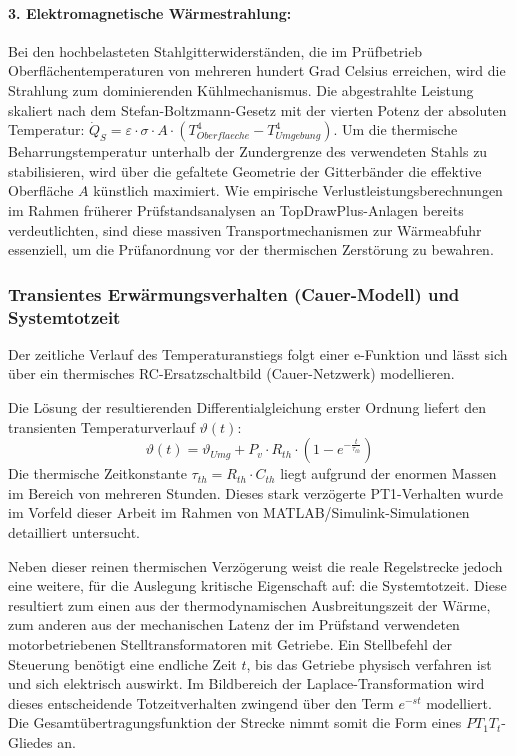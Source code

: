 \paragraph{3. Elektromagnetische Wärmestrahlung:} Bei den hochbelasteten Stahlgitterwiderständen, die im Prüfbetrieb Oberflächentemperaturen von mehreren hundert Grad Celsius erreichen, wird die Strahlung zum dominierenden Kühlmechanismus. Die abgestrahlte Leistung skaliert nach dem Stefan-Boltzmann-Gesetz mit der vierten Potenz der absoluten Temperatur: $\dot{Q}_S = \varepsilon \cdot \sigma \cdot A \cdot \left( T_{Oberflaeche}^4 - T_{Umgebung}^4 \right)$. Um die thermische Beharrungstemperatur unterhalb der Zundergrenze des verwendeten Stahls zu stabilisieren, wird über die gefaltete Geometrie der Gitterbänder die effektive Oberfläche $A$ künstlich maximiert. Wie empirische Verlustleistungsberechnungen im Rahmen früherer Prüfstandsanalysen an TopDrawPlus-Anlagen bereits verdeutlichten, sind diese massiven Transportmechanismen zur Wärmeabfuhr essenziell, um die Prüfanordnung vor der thermischen Zerstörung zu bewahren.
\subsubsection{Transientes Erwärmungsverhalten (Cauer-Modell) und Systemtotzeit}
Der zeitliche Verlauf des Temperaturanstiegs folgt einer e-Funktion und lässt sich über ein thermisches RC-Ersatzschaltbild (Cauer-Netzwerk) modellieren.


Die Lösung der resultierenden Differentialgleichung erster Ordnung liefert den transienten Temperaturverlauf $\vartheta(t)$:
\begin{equation}
    \vartheta(t) = \vartheta_{Umg} + P_v \cdot R_{th} \cdot \left( 1 - e^{-\frac{t}{\tau_{th}}} \right)
\end{equation}
Die thermische Zeitkonstante $\tau_{th} = R_{th} \cdot C_{th}$ liegt aufgrund der enormen Massen im Bereich von mehreren Stunden. Dieses stark verzögerte PT1-Verhalten wurde im Vorfeld dieser Arbeit im Rahmen von MATLAB/Simulink-Simulationen detailliert untersucht. 

Neben dieser reinen thermischen Verzögerung weist die reale Regelstrecke jedoch eine weitere, für die Auslegung kritische Eigenschaft auf: die Systemtotzeit. Diese resultiert zum einen aus der thermodynamischen Ausbreitungszeit der Wärme, zum anderen aus der mechanischen Latenz der im Prüfstand verwendeten motorbetriebenen Stelltransformatoren mit Getriebe. Ein Stellbefehl der Steuerung benötigt eine endliche Zeit $t$, bis das Getriebe physisch verfahren ist und sich elektrisch auswirkt. Im Bildbereich der Laplace-Transformation wird dieses entscheidende Totzeitverhalten zwingend über den Term $e^{-st}$ modelliert. Die Gesamtübertragungsfunktion der Strecke nimmt somit die Form eines $PT_1 T_t$-Gliedes an.

